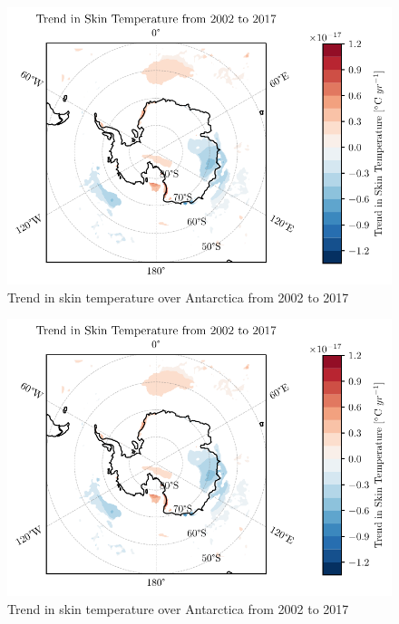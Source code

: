 \documentclass[../main.tex]{subfiles}
\begin{document}
\begin{figure}[!hbt]
    \centering
    \includegraphics{images/2021w5/chapter7/hres/trend_spatial_skt}
    \caption{Trend in skin temperature over Antarctica from 2002 to 2017}
    \label{fig:trend_skt_02_17}
\end{figure}
\begin{figure}[!hbt]
    \centering
    \includegraphics{images/2021w5/chapter7/hres/trend_spatial_skt}
    \caption{Trend in skin temperature over Antarctica from 2002 to 2017}
    \label{fig:trend_skt_02_17}
\end{figure}
\end{document}
